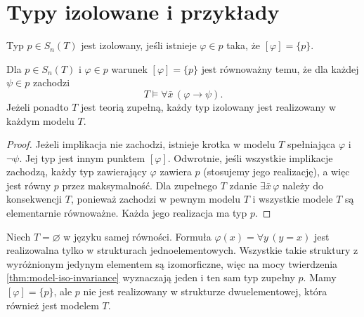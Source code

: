\section{Typy izolowane i przykłady}
\begin{definicja}
\label{def:mod-isolated-type}
Typ $p\in S_n(T)$ jest izolowany, jeśli istnieje
$\varphi\in p$ taka, że $[\varphi]=\{p\}$.
\end{definicja}

\begin{twierdzenie}
\label{thm:mod-isolated-type-characterization}
Dla $p\in S_n(T)$ i $\varphi\in p$ warunek
$[\varphi]=\{p\}$ jest równoważny temu, że
dla każdej $\psi\in p$ zachodzi
\[
T\models\forall\bar x\,(\varphi\to\psi).
\]
Jeżeli ponadto $T$ jest teorią zupełną, każdy typ izolowany
jest realizowany w każdym modelu $T$.
\end{twierdzenie}
\begin{proof}
Jeżeli implikacja nie zachodzi, istnieje krotka w modelu
$T$ spełniająca $\varphi$ i $\neg\psi$. Jej typ jest
innym punktem $[\varphi]$. Odwrotnie, jeśli wszystkie
implikacje zachodzą, każdy typ zawierający $\varphi$
zawiera $p$ (stosujemy jego realizację), a więc jest równy
$p$ przez maksymalność. Dla zupełnego $T$ zdanie
$\exists\bar x\,\varphi$ należy do konsekwencji $T$,
ponieważ zachodzi w pewnym modelu $T$ i wszystkie modele
$T$ są elementarnie równoważne. Każda jego realizacja
ma typ $p$.
\end{proof}

\begin{przyklad}
\label{ex:mod-isolated-incomplete}
Niech $T=\varnothing$ w języku samej równości.
Formuła $\varphi(x)=\forall y\,(y=x)$ jest realizowalna
tylko w strukturach jednoelementowych. Wszystkie takie
struktury z wyróżnionym jedynym elementem są izomorficzne,
więc na mocy twierdzenia \ref{thm:model-iso-invariance}
wyznaczają jeden i ten sam typ zupełny $p$.
Mamy $[\varphi]=\{p\}$, ale $p$ nie jest realizowany
w strukturze dwuelementowej, która również jest modelem $T$.
\end{przyklad}


